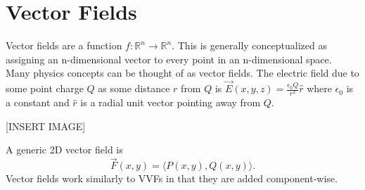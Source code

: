 \section{Vector Fields}
\noindent
Vector fields are a function $f : \mathbb{R}^n \to \mathbb{R}^n$. This is generally conceptualized as assigning an n-dimensional vector to every point in an n-dimensional space.\\
Many physics concepts can be thought of as vector fields. The electric field due to some point charge $Q$ as some distance $r$ from $Q$ is $\vec{E}(x,y,z) = \frac{\epsilon_{0}Q}{r^2}\hat{r}$ where $\epsilon_{0}$ is a constant and $\hat{r}$ is a radial unit vector pointing away from $Q$.

[INSERT IMAGE]

\noindent
A generic 2D vector field is 
\begin{equation*}
	\vec{F}(x,y) = \langle P(x,y), Q(x,y) \rangle.
\end{equation*}
Vector fields work similarly to VVFs in that they are added component-wise.